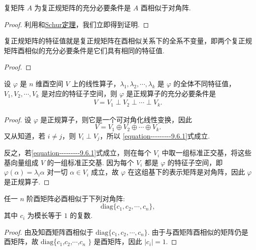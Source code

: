 \documentclass[../../main.tex]{subfiles}
\begin{document}
\begin{theorem}\label{theorem:复正规矩阵等价于酉相似于对角阵的矩阵}
复矩阵 $A$ 为复正规矩阵的充分必要条件是 $A$ 酉相似于对角阵.
\end{theorem}
\begin{proof}
利用和\hyperref[theorem:Schur(舒尔)定理]{Schur定理}，我们立即得到证明.
\end{proof}

\begin{theorem}\label{theorem:复正规矩阵的特征值就是复正规矩阵在酉相似关系下的全系不变量}
复正规矩阵的特征值就是复正规矩阵在酉相似关系下的全系不变量，即两个复正规矩阵酉相似的充分必要条件是它们具有相同的特征值.
\end{theorem}
\begin{proof}

\end{proof}

\begin{proposition}
设 $\varphi$ 是 $n$ 维酉空间 $V$ 上的线性算子，$\lambda_1,\lambda_2,\cdots,\lambda_k$ 是 $\varphi$ 的全体不同特征值，$V_1,V_2,\cdots,V_k$ 是对应的特征子空间，则 $\varphi$ 是正规算子的充分必要条件是
\begin{align}\label{equation---------9.6.1}
V = V_1 \perp V_2 \perp \cdots \perp V_k. 
\end{align}
\end{proposition}
\begin{proof}
设 $\varphi$ 是正规算子，则它是一个可对角化线性变换，因此
\[
V = V_1 \oplus V_2 \oplus \cdots \oplus V_k.
\]
又从知道，若 $i \neq j$，则 $V_i \perp V_j$，所以 \eqref{equation---------9.6.1}式成立.

反之，若\eqref{equation---------9.6.1}式成立，则在每个 $V_i$ 中取一组标准正交基，将这些基向量组成 $V$ 的一组标准正交基. 因为每个 $V_i$ 都是 $\varphi$ 的特征子空间，即 $\varphi(\alpha) = \lambda_i\alpha$ 对一切 $\alpha \in V_i$ 成立，故 $\varphi$ 在这组基下的表示矩阵是对角阵，因此 $\varphi$ 是正规算子. 
\end{proof}

\begin{theorem}
任一 $n$ 阶酉矩阵必酉相似于下列对角阵:
\[
\mathrm{diag}\{c_1,c_2,\cdots,c_n\},
\]
其中 $c_i$ 为模长等于 $1$ 的复数.
\end{theorem}
\begin{proof}
由及知酉矩阵酉相似于 $\mathrm{diag}\{c_1,c_2,\cdots,c_n\}$. 由于与酉矩阵酉相似的矩阵仍是酉矩阵，故 $\mathrm{diag}$\{$c_1$,$c_2$,$\cdots$,$c_n$ $\}$ 是酉矩阵，因此 $|c_i| = 1$.
\end{proof}
\end{document}
